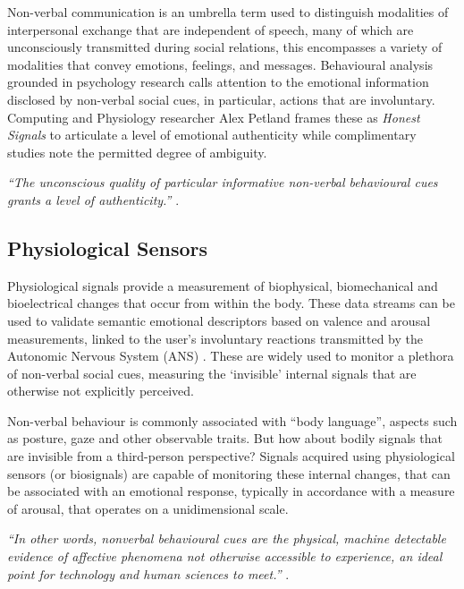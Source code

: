 Non-verbal communication is an umbrella term used to distinguish modalities of interpersonal exchange that are independent of speech, many of which are unconsciously transmitted during social relations, this encompasses a variety of modalities that convey emotions, feelings, and messages. Behavioural analysis grounded in psychology research calls attention to the emotional information disclosed by non-verbal social cues, in particular, actions that are involuntary. Computing and Physiology researcher Alex Petland frames these as \textit{Honest Signals} to articulate a level of emotional authenticity while complimentary studies note the permitted degree of ambiguity.

\textit{``The unconscious quality of particular informative non-verbal behavioural cues grants a level of authenticity.''} \citeauthor{pentland_honest_2010} \cite{pentland_honest_2010}.

\subsection*{Physiological Sensors}

Physiological signals provide a measurement of biophysical, biomechanical and bioelectrical changes that occur from within the body. These data streams can be used to validate semantic emotional descriptors based on valence and arousal measurements, linked to the user’s involuntary reactions transmitted by the Autonomic Nervous System (ANS) \cite{levenson_autonomic_2014,shu_review_2018}. These are widely used to monitor a plethora of non-verbal social cues, measuring the ‘invisible’ internal signals that are otherwise not explicitly perceived.

Non-verbal behaviour is commonly associated with “body language”, aspects such as posture, gaze and other observable traits. But how about bodily signals that are invisible from a third-person perspective? Signals acquired using physiological sensors (or biosignals) are capable of monitoring these internal changes, that can be associated with an emotional response, typically in accordance with a measure of arousal, that operates on a unidimensional scale.

\textit{``In other words, nonverbal behavioural cues are the physical, machine detectable evidence of affective phenomena not otherwise accessible to experience, an ideal point for technology and human sciences to meet.''} \citeauthor{vinciarelli_towards_2011} \cite{vinciarelli_towards_2011}.


